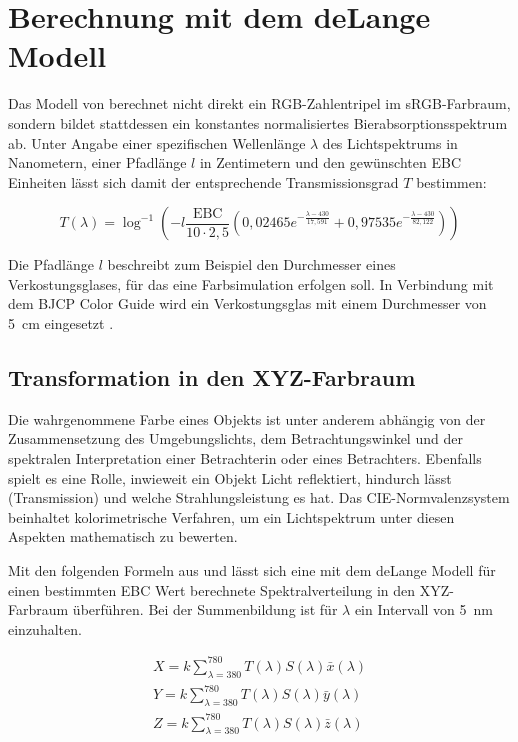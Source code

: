 \documentclass[10pt,a4paper,DIV=12,parskip=half]{scrarticle}
\begin{document}
\section*{Berechnung mit dem deLange Modell}

Das Modell von \cite{deLange2016} berechnet nicht direkt ein RGB-Zahlentripel im sRGB-Farbraum, sondern bildet stattdessen ein konstantes normalisiertes Bierabsorptionsspektrum ab. Unter Angabe einer spezifischen Wellenlänge $\lambda$ des Lichtspektrums in Nanometern, einer Pfadlänge $l$ in Zentimetern und den gewünschten EBC Einheiten lässt sich damit der entsprechende Transmissionsgrad $T$ bestimmen:

\begin{equation*}
T(\lambda)=\log^{-1}\left(-l \frac{\text{EBC}}{10 \cdot 2,5} \left(0,02465e^{-\frac{\lambda-430}{17,591}}+0,97535e^{-\frac{\lambda-430}{82,122}}\right)\right)
\end{equation*}

Die Pfadlänge $l$ beschreibt zum Beispiel den Durchmesser eines Verkostungsglases, für das eine Farbsimulation erfolgen soll. In Verbindung mit dem BJCP Color Guide wird ein Verkostungsglas mit einem Durchmesser von 5~cm eingesetzt \parencite{BJCP}. 

\subsection*{Transformation in den XYZ-Farbraum}

Die wahrgenommene Farbe eines Objekts ist unter anderem abhängig von der Zusammensetzung des Umgebungslichts, dem Betrachtungswinkel und der spektralen Interpretation einer Betrachterin oder eines Betrachters. Ebenfalls spielt es eine Rolle, inwieweit ein Objekt Licht reflektiert, hindurch lässt (Transmission) und welche Strahlungsleistung es hat. Das CIE-Normvalenzsystem beinhaltet kolorimetrische Verfahren, um ein Lichtspektrum unter diesen Aspekten mathematisch zu bewerten. \parencite{ASTM2022}

Mit den folgenden Formeln aus \cite{ASTM2022} und \cite{ASBC2011} lässt sich eine mit dem deLange Modell für einen bestimmten EBC Wert berechnete Spektralverteilung in den XYZ-Farbraum überführen. Bei der Summenbildung ist für $\lambda$ ein Intervall von 5~nm einzuhalten.

\begin{equation*}
	\begin{gathered}
		X = k \sum_{\lambda=380}^{780} T(\lambda) S(\lambda) \bar{x}(\lambda) \\
		Y = k \sum_{\lambda=380}^{780} T(\lambda) S(\lambda) \bar{y}(\lambda) \\
		Z = k \sum_{\lambda=380}^{780} T(\lambda) S(\lambda) \bar{z}(\lambda)
	\end{gathered}
\end{equation*}
\end{document}
